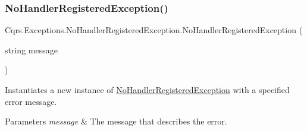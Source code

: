 \subsubsection{\texorpdfstring{No\+Handler\+Registered\+Exception()}{NoHandlerRegisteredException()}\hspace{0.1cm}{\footnotesize\ttfamily [2/2]}}
{\footnotesize\ttfamily Cqrs.\+Exceptions.\+No\+Handler\+Registered\+Exception.\+No\+Handler\+Registered\+Exception (\begin{DoxyParamCaption}\item[{string}]{message }\end{DoxyParamCaption})}



Instantiates a new instance of \hyperlink{classCqrs_1_1Exceptions_1_1NoHandlerRegisteredException}{No\+Handler\+Registered\+Exception} with a specified error message. 


\begin{DoxyParams}{Parameters}
{\em message} & The message that describes the error.\\
\hline
\end{DoxyParams}

